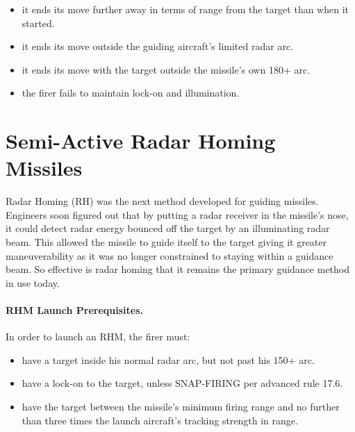 \begin{itemize}

    \item it ends its move further away in terms of range from the target than when it started.

    \item it ends its move outside the guiding aircraft's limited radar arc.

    \item it ends its move with the target outside the missile's own 180+ arc.

    \item the firer fails to maintain lock-on and illumination.

\end{itemize}

\section{Semi-Active Radar Homing Missiles}
\label{rule:semi-active-radar-homing-missiles}

Radar Homing (RH) was the next method developed for guiding missiles. Engineers soon figured out that by putting a radar receiver in the missile's nose, it could detect radar energy bounced off the target by an illuminating radar beam. This allowed the missile to guide itself to the target giving it greater maneuverability as it was no longer constrained to staying within a guidance beam. So effective is radar homing that it remains the primary guidance method in use today.

\paragraph{RHM Launch Prerequisites.} In order to launch an RHM, the firer must:

\begin{itemize}

    \item have a target inside his normal radar arc, but not past his 150+ arc.

    \item have a lock-on to the target, unless SNAP-FIRING per advanced rule 17.6.

    \item have the target between the missile's minimum firing range and no further than three times the launch aircraft's tracking strength in range.

\end{itemize}


